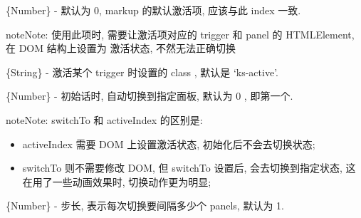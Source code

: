 \documentclass[letterpaper,10pt,english]{sphinxmanual}
\begin{document}

\begin{fulllineitems}
\label{api/component/switchable/switchable:Switchable.activeIndex}
\{Number\} - 默认为 0,  markup 的默认激活项, 应该与此 index 一致.

\begin{notice}{note}{Note:}
使用此项时, 需要让激活项对应的 trigger 和 panel 的 HTMLElement, 在 DOM 结构上设置为 激活状态, 不然无法正确切换
\end{notice}

\end{fulllineitems}



\begin{fulllineitems}
\label{api/component/switchable/switchable:Switchable.activeTriggerCls}
\{String\} - 激活某个 trigger 时设置的 class , 默认是 `ks-active'.

\end{fulllineitems}



\begin{fulllineitems}
\label{api/component/switchable/switchable:Switchable.switchTo}
\{Number\} - 初始话时, 自动切换到指定面板, 默认为 0 , 即第一个.

\begin{notice}{note}{Note:}
switchTo 和 activeIndex 的区别是:
\begin{itemize}
\item {}
activeIndex 需要 DOM 上设置激活状态, 初始化后不会去切换状态;

\item {}
switchTo 则不需要修改 DOM, 但 switchTo 设置后, 会去切换到指定状态, 这在用了一些动画效果时, 切换动作更为明显;

\end{itemize}
\end{notice}

\end{fulllineitems}



\begin{fulllineitems}
\label{api/component/switchable/switchable:Switchable.steps}
\{Number\} - 步长, 表示每次切换要间隔多少个 panels, 默认为 1.

\end{fulllineitems}
\end{document}
